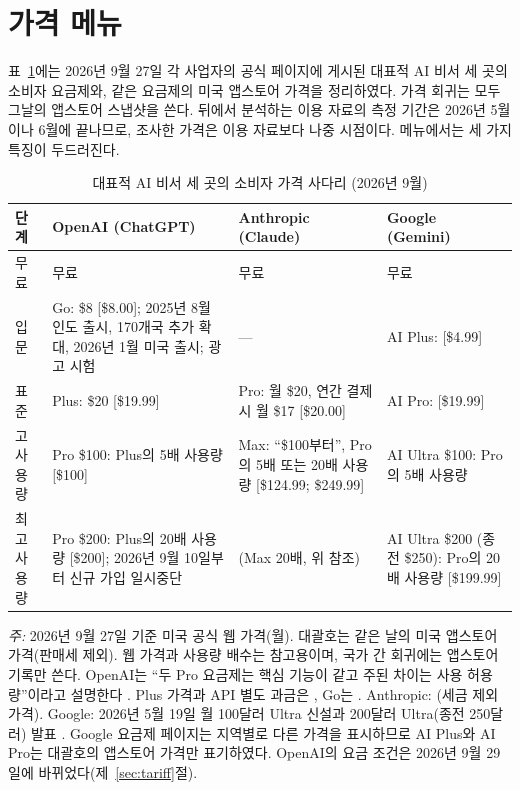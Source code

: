 \documentclass[11pt]{article}
\theoremstyle{definition}
\theoremstyle{remark}
\begin{document}
\section{가격 메뉴}\label{sec:background}

표~\ref{tab:ladder}에는 2026년 9월 27일 각 사업자의 공식 페이지에 게시된 대표적 AI 비서 세 곳의 소비자 요금제와, 같은 요금제의 미국 앱스토어 가격을 정리하였다. 가격 회귀는 모두 그날의 앱스토어 스냅샷을 쓴다. 뒤에서 분석하는 이용 자료의 측정 기간은 2026년 5월이나 6월에 끝나므로, 조사한 가격은 이용 자료보다 나중 시점이다. 메뉴에서는 세 가지 특징이 두드러진다.

\begin{table}[t]
\centering
\begin{threeparttable}
\caption{대표적 AI 비서 세 곳의 소비자 가격 사다리 (2026년 9월)}\label{tab:ladder}
\small
\begin{tabularx}{\textwidth}{@{}l>{\raggedright\arraybackslash}X>{\raggedright\arraybackslash}X>{\raggedright\arraybackslash}X@{}}
\toprule
단계 & OpenAI (ChatGPT) & Anthropic (Claude) & Google (Gemini) \\
\midrule
무료 & 무료 & 무료 & 무료 \\
입문 & Go: \$8 [\$8.00]; 2025년 8월 인도 출시, 170개국 추가 확대, 2026년 1월 미국 출시; 광고 시험 & --- & AI Plus: [\$4.99] \\
표준 & Plus: \$20 [\$19.99] & Pro: 월 \$20, 연간 결제 시 월 \$17 [\$20.00] & AI Pro: [\$19.99] \\
고사용량 & Pro \$100: Plus의 5배 사용량 [\$100] & Max: ``\$100부터'', Pro의 5배 또는 20배 사용량 [\$124.99; \$249.99] & AI Ultra \$100: Pro의 5배 사용량 \\
최고사용량 & Pro \$200: Plus의 20배 사용량 [\$200]; 2026년 9월 10일부터 신규 가입 일시중단 & (Max 20배, 위 참조) & AI Ultra \$200 (종전 \$250): Pro의 20배 사용량 [\$199.99] \\
\bottomrule
\end{tabularx}
\begin{tablenotes}[flushleft]\footnotesize
\item \emph{주:} 2026년 9월 27일 기준 미국 공식 웹 가격(월). 대괄호는 같은 날의 미국 앱스토어 가격(판매세 제외). 웹 가격과 사용량 배수는 참고용이며, 국가 간 회귀에는 앱스토어 기록만 쓴다. OpenAI는 ``두 Pro 요금제는 핵심 기능이 같고 주된 차이는 사용 허용량''이라고 설명한다 \citep{openai2026pro}. Plus 가격과 API 별도 과금은 \citet{openai2026plus}, Go는 \citet{openai2026go}. Anthropic: \citet{anthropic2026pricing}(세금 제외 가격). Google: 2026년 5월 19일 월 100달러 Ultra 신설과 200달러 Ultra(종전 250달러) 발표 \citep{google2026io}. Google 요금제 페이지는 지역별로 다른 가격을 표시하므로 AI Plus와 AI Pro는 대괄호의 앱스토어 가격만 표기하였다. OpenAI의 요금 조건은 2026년 9월 29일에 바뀌었다(제~\ref{sec:tariff}절).
\end{tablenotes}
\end{threeparttable}
\end{table}
\end{document}
